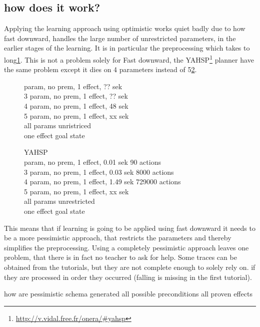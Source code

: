 \subsection{how does it work?}
Applying the learning approach using optimistic works quiet badly due to how fast downward, handles the large number of unrestricted parameters, in the earlier stages of the learning. It is in particular the preprocessing which takes to long\ref{opt-fd}. This is not a problem solely for Fast downward, the YAHSP\footnote{\url{http://v.vidal.free.fr/onera/\#yahsp}} planner have the same problem except it dies on 4 parameters instead of 5\ref{opt-ya}.
\begin{figure}
	\label{opt-fd}
	 param, no prem, 1 effect, ?? sek\\
	3 param, no prem, 1 effect, ?? sek\\
	4 param, no prem, 1 effect, 48 sek\\
	5 param, no prem, 1 effect, xx sek\\

	all params unristriced\\
	one effect goal state\\
\end{figure}
\begin{figure}
	YAHSP\\
	\label{opt-ya}
	 param, no prem, 1 effect, 0.01 sek 90 actions\\
	3 param, no prem, 1 effect, 0.03 sek 8000 actions\\
	4 param, no prem, 1 effect, 1.49 sek 729000 actions\\
	5 param, no prem, 1 effect, xx sek\\
	
	all params unrestricted\\
	one effect goal state\\
\end{figure}


This means that if learning is going to be applied using fast downward it needs to be a more pessimistic approach, that restricts the parameters and thereby simplifies the preprocessing. Using a completely pessimistic approach leaves one problem, that there is in fact no teacher to ask for help. Some traces can be obtained from the tutorials, but they are not complete enough to solely rely on. if they are processed in order they occurred (falling is missing in the first tutorial).  

how are pessimistic schema generated
	all possible preconditions
	all proven effects

